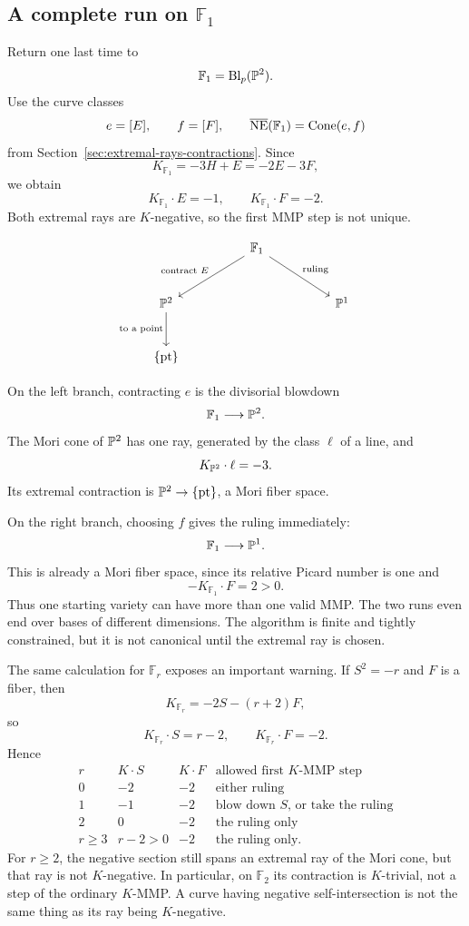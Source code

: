 \subsection{A complete run on \texorpdfstring{\(\mathbb F_1\)}{F1}}

Return one last time to
\[
\mathbb F_1=\operatorname{Bl}_p(\mathbb{P}^2).
\]
Use the curve classes
\[
e=[E],
\qquad
f=[F],
\qquad
\overline{\operatorname{NE}}(\mathbb F_1)=\operatorname{Cone}(e,f)
\]
from Section~\ref{sec:extremal-rays-contractions}.  Since
\[
K_{\mathbb F_1}=-3H+E=-2E-3F,
\]
we obtain
\[
K_{\mathbb F_1}\cdot E=-1,
\qquad
K_{\mathbb F_1}\cdot F=-2.
\]
Both extremal rays are \(K\)-negative, so the first MMP step is not
unique.

\[
\begin{tikzcd}[column sep=huge,row sep=large]
&\mathbb F_1
  \arrow[dl,"\text{contract }E"']
  \arrow[dr,"\text{ruling}"]
&
\\
\PP^2 \arrow[d,"\text{to a point}"']
&&\PP^1
\\
\{\mathrm{pt}\}&&
\end{tikzcd}
\]

On the left branch, contracting \(e\) is the divisorial blowdown
\[
\mathbb F_1\longrightarrow\mathbb{P}^2.
\]
The Mori cone of \(\mathbb{P}^2\) has one ray, generated by the class \(\ell\)
of a line, and
\[
K_{\mathbb{P}^2}\cdot\ell=-3.
\]
Its extremal contraction is \(\mathbb{P}^2\to\{\mathrm{pt}\}\), a Mori fiber
space.

On the right branch, choosing \(f\) gives the ruling immediately:
\[
\mathbb F_1\longrightarrow\mathbb{P}^1.
\]
This is already a Mori fiber space, since its relative Picard number is
one and
\[
-K_{\mathbb F_1}\cdot F=2>0.
\]
Thus one starting variety can have more than one valid MMP.  The two
runs even end over bases of different dimensions.  The algorithm is
finite and tightly constrained, but it is not canonical until the
extremal ray is chosen.

\begin{surfacelaboratory}
The same calculation for \(\mathbb F_r\) exposes an important warning.
If \(S^2=-r\) and \(F\) is a fiber, then
\[
K_{\mathbb F_r}=-2S-(r+2)F,
\]
so
\[
K_{\mathbb F_r}\cdot S=r-2,
\qquad
K_{\mathbb F_r}\cdot F=-2.
\]
Hence
\[
\begin{array}{c|c|c|c}
r&K\cdot S&K\cdot F&\text{allowed first \(K\)-MMP step}
\\
\hline
0&-2&-2&\text{either ruling}
\\
1&-1&-2&\text{blow down \(S\), or take the ruling}
\\
2&0&-2&\text{the ruling only}
\\
r\geq3&r-2>0&-2&\text{the ruling only.}
\end{array}
\]
For \(r\geq2\), the negative section still spans an extremal ray of the
Mori cone, but that ray is not \(K\)-negative.  In particular, on
\(\mathbb F_2\) its contraction is \(K\)-trivial, not a step of the
ordinary \(K\)-MMP.  A curve having negative self-intersection is not
the same thing as its ray being \(K\)-negative.
\end{surfacelaboratory}

